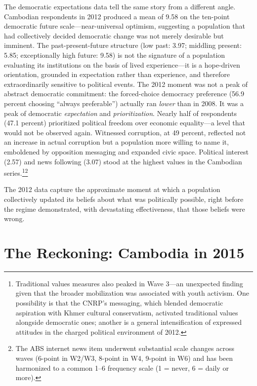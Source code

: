 \documentclass[
  12pt,
  letterpaper]{article}
\begin{document}
The democratic expectations data tell the same story from a different
angle. Cambodian respondents in 2012 produced a mean of 9.58 on the
ten-point democratic future scale---near-universal optimism, suggesting
a population that had collectively decided democratic change was not
merely desirable but imminent. The past-present-future structure (low
past: 3.97; middling present: 5.85; exceptionally high future: 9.58) is
not the signature of a population evaluating its institutions on the
basis of lived experience---it is a hope-driven orientation, grounded in
expectation rather than experience, and therefore extraordinarily
sensitive to political events. The 2012 moment was not a peak of
abstract democratic commitment: the forced-choice democracy preference
(56.9 percent choosing ``always preferable'') actually ran \emph{lower}
than in 2008. It was a peak of democratic \emph{expectation} and
\emph{prioritization}. Nearly half of respondents (47.1 percent)
prioritized political freedom over economic equality---a level that
would not be observed again. Witnessed corruption, at 49 percent,
reflected not an increase in actual corruption but a population more
willing to name it, emboldened by opposition messaging and expanded
civic space. Political interest (2.57) and news following (3.07) stood
at the highest values in the Cambodian series.\footnote{Traditional
  values measures also peaked in Wave 3---an unexpected finding given
  that the broader mobilization was associated with youth activism. One
  possibility is that the CNRP's messaging, which blended democratic
  aspiration with Khmer cultural conservatism, activated traditional
  values alongside democratic ones; another is a general intensification
  of expressed attitudes in the charged political environment of 2012.}\footnote{The
  ABS internet news item underwent substantial scale changes across
  waves (6-point in W2/W3, 8-point in W4, 9-point in W6) and has been
  harmonized to a common 1--6 frequency scale (1 = never, 6 = daily or
  more).}

The 2012 data capture the approximate moment at which a population
collectively updated its beliefs about what was politically possible,
right before the regime demonstrated, with devastating effectiveness,
that those beliefs were wrong.

\section{The Reckoning: Cambodia in
2015}\label{the-reckoning-cambodia-in-2015}
\end{document}
